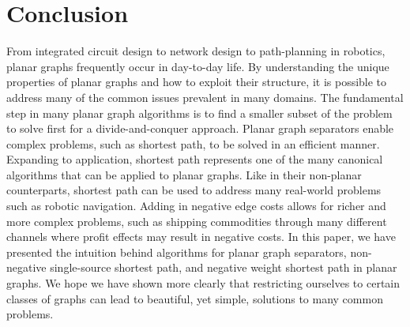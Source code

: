 \documentclass[12pt]{article}
\begin{document}
\section{Conclusion}
\label{sec:conclusion}

From integrated circuit design to network design to path-planning in robotics, planar graphs frequently occur in day-to-day life. By understanding the unique properties of planar graphs and how to exploit their structure, it is possible to address many of the common issues prevalent in many domains. The fundamental step in many planar graph algorithms is to find a smaller subset of the problem to solve first for a divide-and-conquer approach. Planar graph separators enable complex problems, such as shortest path, to be solved in an efficient manner. Expanding to application, shortest path represents one of the many canonical algorithms that can be applied to planar graphs. Like in their non-planar counterparts, shortest path can be used to address many real-world problems such as robotic navigation. Adding in negative edge costs allows for richer and more complex problems, such as shipping commodities through many different channels where profit effects may result in negative costs. In this paper, we have presented the intuition behind algorithms for planar graph separators, non-negative single-source shortest path, and negative weight shortest path in planar graphs. We hope we have shown more clearly that restricting ourselves to certain classes of graphs can lead to beautiful, yet simple, solutions to many common problems.



\end{document}
